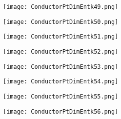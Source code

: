 \documentclass[pdf]{beamer}
\begin{document}
\begin{frame}
\begin{figure}[!h]
\centering
\texttt{[image: ConductorPtDimEntk49.png]}
\end{figure}
\end{frame}

\begin{frame}
\begin{figure}[!h]
\centering
\texttt{[image: ConductorPtDimEntk50.png]}
\end{figure}
\end{frame}

\begin{frame}
\begin{figure}[!h]
\centering
\texttt{[image: ConductorPtDimEntk51.png]}
\end{figure}
\end{frame}

\begin{frame}
\begin{figure}[!h]
\centering
\texttt{[image: ConductorPtDimEntk52.png]}
\end{figure}
\end{frame}

\begin{frame}
\begin{figure}[!h]
\centering
\texttt{[image: ConductorPtDimEntk53.png]}
\end{figure}
\end{frame}

\begin{frame}
\begin{figure}[!h]
\centering
\texttt{[image: ConductorPtDimEntk54.png]}
\end{figure}
\end{frame}

\begin{frame}
\begin{figure}[!h]
\centering
\texttt{[image: ConductorPtDimEntk55.png]}
\end{figure}
\end{frame}

\begin{frame}
\begin{figure}[!h]
\centering
\texttt{[image: ConductorPtDimEntk56.png]}
\end{figure}
\end{frame}
\end{document}

